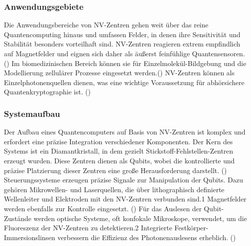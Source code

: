 \subsubsection{Anwendungsgebiete}
Die Anwendungsbereiche von NV-Zentren gehen weit über das reine Quantencomputing hinaus und umfassen Felder, in denen ihre Sensitivität und Stabilität besonders vorteilhaft sind. NV-Zentren reagieren extrem empfindlich auf Magnetfelder und eignen sich daher als äußerst feinfühlige Quantensensoren. (\cite{NVZentrenStickstoffFehlstellenDLR}) Im biomedizinischen Bereich können sie für Einzelmolekül-Bildgebung und die Modellierung zellulärer Prozesse eingesetzt werden.(\cite{NitrogenvacancyCenter2025}) NV-Zentren können als Einzelphotonenquellen dienen, was eine wichtige Voraussetzung für abhörsichere Quantenkryptographie ist. (\cite{ein_quantencomputer_in_diamant})
\subsubsection{Systemaufbau}
Der Aufbau eines Quantencomputers auf Basis von NV-Zentren ist komplex und erfordert eine präzise Integration verschiedener Komponenten.
Der Kern des Systems ist ein Diamantkristall, in dem gezielt Stickstoff-Fehlstellen-Zentren erzeugt wurden. Diese Zentren dienen als Qubits, wobei die kontrollierte und präzise Platzierung dieser Zentren eine große Herausforderung darstellt. (\cite{ein_quantencomputer_in_diamant})
Steuerungssysteme erzeugen präzise Signale zur Manipulation der Qubits. Dazu gehören Mikrowellen- und Laserquellen, die über lithographisch definierte Wellenleiter und Elektroden mit den NV-Zentren verbunden sind.1 Magnetfelder werden ebenfalls zur Kontrolle eingesetzt. (\cite{gmbhCCGFachartikelQuantencomputer2025})
Für das Auslesen der Qubit-Zustände werden optische Systeme, oft konfokale Mikroskope, verwendet, um die Fluoreszenz der NV-Zentren zu detektieren.2 Integrierte Festkörper-Immersionslinsen verbessern die Effizienz des Photonenauslesens erheblich. (\cite{childressDiamondNVCenters2013})
